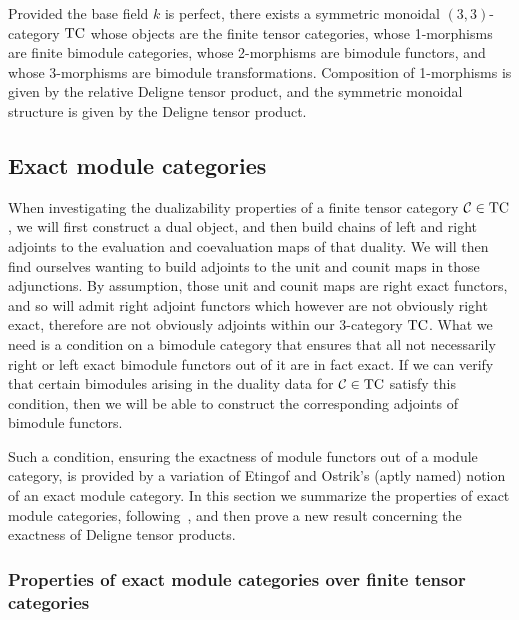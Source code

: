 \documentclass{amsart}
\begin{document}
\begin{theorem}[\cite{3TC}]
Provided the base field $k$ is perfect, there exists a symmetric monoidal $(3,3)$-category $\mathrm{TC}$ whose objects are the finite tensor categories, whose 1-morphisms are finite bimodule categories, whose 2-morphisms are bimodule functors, and whose 3-morphisms are bimodule transformations.  Composition of 1-morphisms is given by the relative Deligne tensor product, and the symmetric monoidal structure is given by the Deligne tensor product.
\end{theorem}


\subsection{Exact module categories} \label{sec:tc-exact}

When investigating the dualizability properties of a finite tensor category $\mathcal C \in \mathrm{TC}$, we will first construct a dual object, and then build chains of left and right adjoints to the evaluation and coevaluation maps of that duality.  We will then find ourselves wanting to build adjoints to the unit and counit maps in those adjunctions.  By assumption, those unit and counit maps are right exact functors, and so will admit right adjoint functors which however are not obviously right exact, therefore are not obviously adjoints within our 3-category $\mathrm{TC}$.  What we need is a condition on a bimodule category that ensures that all not necessarily right or left exact bimodule functors out of it are in fact exact.  If we can verify that certain bimodules arising in the duality data for $\mathcal C \in \mathrm{TC}$ satisfy this condition, then we will be able to construct the corresponding adjoints of bimodule functors.

Such a condition, ensuring the exactness of module functors out of a module category, is provided by a variation of Etingof and Ostrik's (aptly named) notion of an exact module category.  In this section we summarize the properties of exact module categories, following~\cite{EO-ftc}, and then prove a new result concerning the exactness of Deligne tensor products.


\subsubsection{Properties of exact module categories over finite tensor categories}
\end{document}
